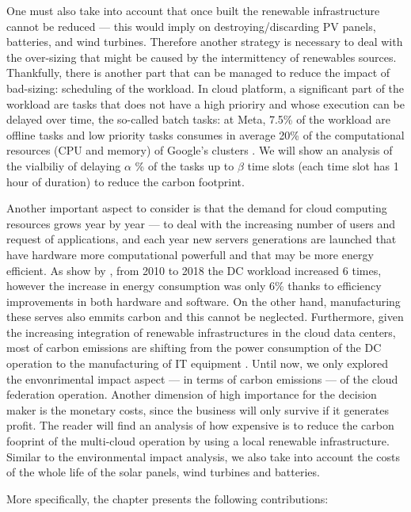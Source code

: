 One must also take into account that once built the renewable infrastructure cannot be reduced --- this would imply on destroying/discarding PV panels, batteries, and wind turbines. Therefore another strategy is necessary to deal with the over-sizing that might be caused by the intermittency of renewables sources. Thankfully, there is another part that can be managed to reduce the impact of bad-sizing: scheduling of the workload. In cloud platform, a significant part of the workload are tasks that does not have a high prioriry and whose execution can be delayed over time, the so-called batch tasks: at Meta, 7.5\% of the workload are offline tasks \cite{acun2022holistic} and low priority tasks consumes in average 20\% of the computational resources (CPU and memory) of Google's clusters \cite{googleborg_2020}. We will show an analysis of the vialbiliy of delaying $\alpha$ \% of the tasks up  to $\beta$ time slots (each time slot has 1 hour of duration) to reduce the carbon footprint.

Another important aspect to consider is that the demand for cloud computing resources grows year by year --- to deal with the increasing number of users and request of applications, and each year new servers generations are launched that have hardware more computational powerfull and that may be more energy efficient. As show by \citet{masanet2020recalibrating}, from 2010 to 2018 the DC workload increased 6 times, however the increase in energy consumption was only 6\% thanks to efficiency improvements in both hardware and software.  On the other hand, manufacturing these serves also emmits carbon and this cannot be neglected. Furthermore, given the increasing integration of renewable infrastructures in the cloud data centers, most of carbon emissions are shifting from the power consumption of the DC operation to the manufacturing of IT equipment \cite{gupta2021_chasingcarbon}.
Until now, we only explored the envonrimental impact aspect --- in terms of carbon emissions --- of the cloud federation operation. Another dimension of high importance for the decision maker is the monetary costs, since the business will only survive if it generates profit. The reader will find an analysis of how expensive is to reduce the carbon fooprint of the multi-cloud operation by using a local renewable infrastructure. Similar to the environmental impact analysis, we also take into account the costs of the whole life of the solar panels, wind turbines and batteries. 

More specifically, the chapter presents the following contributions:

